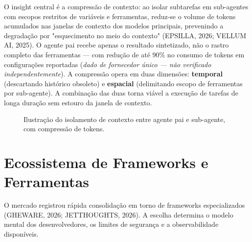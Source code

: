 \documentclass[12pt,a4paper]{article}
\begin{document}
O insight central é a compressão de contexto: ao isolar subtarefas em sub-agentes com escopos restritos de variáveis e ferramentas, reduz-se o volume de tokens acumulados nas janelas de contexto dos modelos principais, prevenindo a degradação por "esquecimento no meio do contexto" (EPSILLA, 2026; VELLUM AI, 2025). O agente pai recebe apenas o resultado sintetizado, não o rastro completo das ferramentas — com redução de até 90\% no consumo de tokens em configurações reportadas (\textit{dado de fornecedor único — não verificado independentemente}). A compressão opera em duas dimensões: \textbf{temporal} (descartando histórico obsoleto) e \textbf{espacial} (delimitando escopo de ferramentas por sub-agente). A combinação das duas torna viável a execução de tarefas de longa duração sem estouro da janela de contexto.
\begin{figure}[htbp]
\centering
{}
\caption{Ilustração do isolamento de contexto entre agente pai e sub-agente, com compressão de tokens.}
\end{figure}


\section{Ecossistema de Frameworks e Ferramentas}

O mercado registrou rápida consolidação em torno de frameworks especializados (GHEWARE, 2026; JETTHOUGHTS, 2026). A escolha determina o modelo mental dos desenvolvedores, os limites de segurança e a observabilidade disponíveis.
\end{document}
